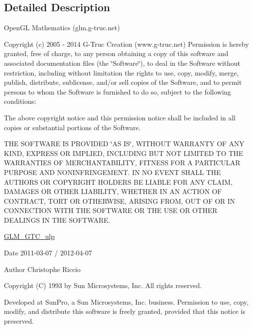 

\subsection{Detailed Description}
Open\+GL Mathematics (glm.\+g-\/truc.\+net)

Copyright (c) 2005 -\/ 2014 G-\/\+Truc Creation (www.\+g-\/truc.\+net) Permission is hereby granted, free of charge, to any person obtaining a copy of this software and associated documentation files (the \char`\"{}\+Software\char`\"{}), to deal in the Software without restriction, including without limitation the rights to use, copy, modify, merge, publish, distribute, sublicense, and/or sell copies of the Software, and to permit persons to whom the Software is furnished to do so, subject to the following conditions\+:

The above copyright notice and this permission notice shall be included in all copies or substantial portions of the Software.

T\+HE S\+O\+F\+T\+W\+A\+RE IS P\+R\+O\+V\+I\+D\+ED \char`\"{}\+A\+S I\+S\char`\"{}, W\+I\+T\+H\+O\+UT W\+A\+R\+R\+A\+N\+TY OF A\+NY K\+I\+ND, E\+X\+P\+R\+E\+SS OR I\+M\+P\+L\+I\+ED, I\+N\+C\+L\+U\+D\+I\+NG B\+UT N\+OT L\+I\+M\+I\+T\+ED TO T\+HE W\+A\+R\+R\+A\+N\+T\+I\+ES OF M\+E\+R\+C\+H\+A\+N\+T\+A\+B\+I\+L\+I\+TY, F\+I\+T\+N\+E\+SS F\+OR A P\+A\+R\+T\+I\+C\+U\+L\+AR P\+U\+R\+P\+O\+SE A\+ND N\+O\+N\+I\+N\+F\+R\+I\+N\+G\+E\+M\+E\+NT. IN NO E\+V\+E\+NT S\+H\+A\+LL T\+HE A\+U\+T\+H\+O\+RS OR C\+O\+P\+Y\+R\+I\+G\+HT H\+O\+L\+D\+E\+RS BE L\+I\+A\+B\+LE F\+OR A\+NY C\+L\+A\+IM, D\+A\+M\+A\+G\+ES OR O\+T\+H\+ER L\+I\+A\+B\+I\+L\+I\+TY, W\+H\+E\+T\+H\+ER IN AN A\+C\+T\+I\+ON OF C\+O\+N\+T\+R\+A\+CT, T\+O\+RT OR O\+T\+H\+E\+R\+W\+I\+SE, A\+R\+I\+S\+I\+NG F\+R\+OM, O\+UT OF OR IN C\+O\+N\+N\+E\+C\+T\+I\+ON W\+I\+TH T\+HE S\+O\+F\+T\+W\+A\+RE OR T\+HE U\+SE OR O\+T\+H\+ER D\+E\+A\+L\+I\+N\+GS IN T\+HE S\+O\+F\+T\+W\+A\+RE.

\hyperlink{group__gtc__ulp}{G\+L\+M\+\_\+\+G\+T\+C\+\_\+ulp}

\begin{DoxyDate}{Date}
2011-\/03-\/07 / 2012-\/04-\/07 
\end{DoxyDate}
\begin{DoxyAuthor}{Author}
Christophe Riccio
\end{DoxyAuthor}
Copyright (C) 1993 by Sun Microsystems, Inc. All rights reserved.

Developed at Sun\+Pro, a Sun Microsystems, Inc. business. Permission to use, copy, modify, and distribute this software is freely granted, provided that this notice is preserved. 

